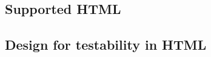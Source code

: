 

\subsection{Supported HTML \gdauts{}}


\subsection{Design for testability in HTML \gdauts{}}
\label{DFTWeb}

